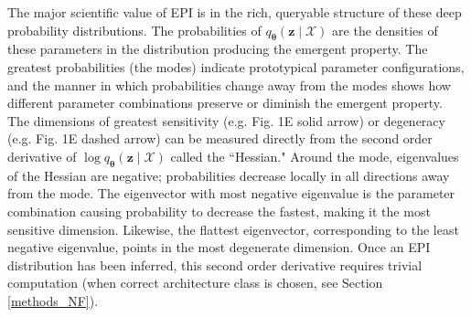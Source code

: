 \documentclass[11pt]{article}
\begin{document}


The major scientific value of EPI is in the rich, queryable structure of these deep probability distributions.
The probabilities of $q_{\bm{\theta}}(\mathbf{z} \mid \mathcal{X})$ are the densities of these parameters in the distribution producing the emergent property.
The greatest probabilities (the modes) indicate prototypical parameter configurations, and the manner in which probabilities change away from the modes shows how different parameter combinations preserve or diminish the emergent property.
The dimensions of greatest sensitivity (e.g. Fig. 1E solid arrow) or degeneracy (e.g. Fig. 1E dashed arrow) can be measured directly from the second order derivative of $\log q_{\bm{\theta}}(\mathbf{z} \mid \mathcal{X})$ called the ``Hessian."
Around the mode, eigenvalues of the Hessian are negative; probabilities decrease locally in all directions away from the mode.
The eigenvector with most negative eigenvalue is the parameter combination causing probability to decrease the fastest, making it the most sensitive dimension.
Likewise, the flattest eigenvector, corresponding to the least negative eigenvalue, points in the most degenerate dimension.
Once an EPI distribution has been inferred, this second order derivative requires trivial computation (when correct architecture class is chosen, see Section \ref{methods_NF}).
\end{document}
